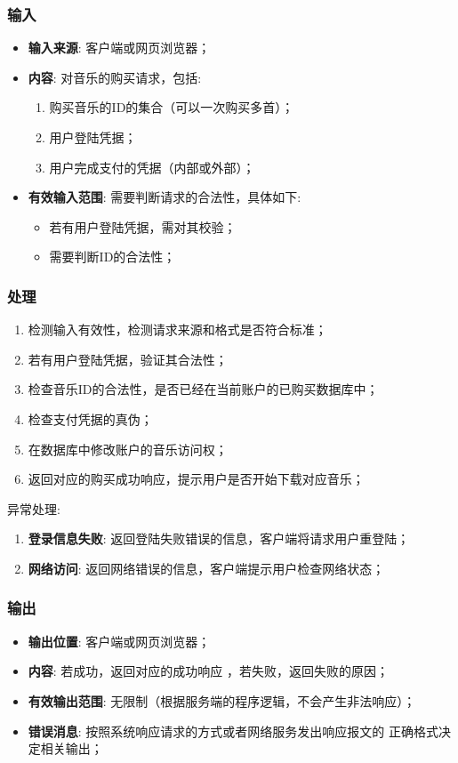 \begin{enumerate}
\subsubsection{输入}
	\begin{itemize}
		\item \textbf{输入来源}: 客户端或网页浏览器；
		\item \textbf{内容}: 对音乐的购买请求，包括: 
		\begin{enumerate}
			\item 购买音乐的ID的集合（可以一次购买多首）；
			\item 用户登陆凭据；
			\item 用户完成支付的凭据（内部或外部）；
		\end{enumerate}
		\item \textbf{有效输入范围}: 需要判断请求的合法性，具体如下: 
		\begin{itemize}
			\item 若有用户登陆凭据，需对其校验； 
			\item 需要判断ID的合法性；
		\end{itemize}
	\end{itemize}
\subsubsection{处理}
	\begin{enumerate}
		\item 检测输入有效性，检测请求来源和格式是否符合标准；
		\item 若有用户登陆凭据，验证其合法性；
		\item 检查音乐ID的合法性，是否已经在当前账户的已购买数据库中；
		\item 检查支付凭据的真伪；
		\item 在数据库中修改账户的音乐访问权；
		\item 返回对应的购买成功响应，提示用户是否开始下载对应音乐；
	\end{enumerate}
	\noindent 异常处理: 
	\begin{enumerate}
		\item \textbf{登录信息失败}: 返回登陆失败错误的信息，客户端将请求用户重登陆；
		\item \textbf{网络访问}: 返回网络错误的信息，客户端提示用户检查网络状态；
	\end{enumerate}
\subsubsection{输出}
\begin{itemize}
	\item \textbf{输出位置}: 客户端或网页浏览器；
	\item \textbf{内容}: 若成功，返回对应的成功响应 ，若失败，返回失败的原因；
	\item \textbf{有效输出范围}: 无限制（根据服务端的程序逻辑，不会产生非法响应）；
	\item \textbf{错误消息}: 按照系统响应请求的方式或者网络服务发出响应报文的
		正确格式决定相关输出；
\end{itemize}


\end{enumerate}
